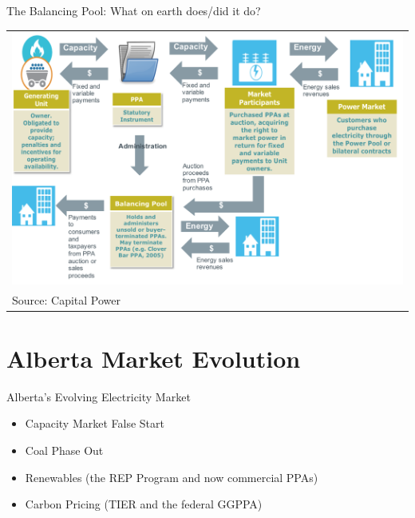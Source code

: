 \documentclass{beamer}
\renewcommand{\(}{\begin{columns}}
\renewcommand{\)}{\end{columns}}
\newcommand{\<}[1]{\begin{column}{#1}}
\renewcommand{\>}{\end{column}}
\begin{document}
\begin{frame}{The Balancing Pool: What on earth does/did it do?}
\vspace{-.2cm}\centering
\hspace{-1.5cm}\begin{tabular}{p{1.1\linewidth}}
    \centering
    \includegraphics[width=.9\linewidth]{../images/balancingpool.png} \\[\abovecaptionskip]
  Source: Capital Power
\end{tabular}

\vfill \end{frame}


\section{Alberta Market Evolution}

\begin{frame}{Alberta's Evolving Electricity Market}
\begin{itemize}
\setlength\itemsep{2em}
\item Capacity Market False Start
\item Coal Phase Out
\item Renewables (the REP Program and now commercial PPAs)
\item Carbon Pricing (TIER and the federal GGPPA)
\end{itemize}

\vfill \end{frame}
\end{document}
